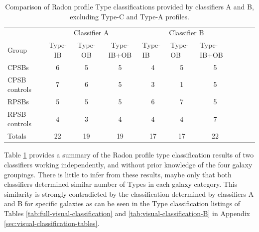 \begin{table}
\caption[Comparison of Radon profile classifications by classifiers A and B, excluding Types A and B]{Comparison of Radon profile Type classifications provided by classifiers A and B, excluding Type-C and Type-A profiles.}
\label{tab:Radon-VC3-results}
\begin{tabular}{lccccccccc}
\hline
 & \multicolumn{3}{c}{Classifier A} & \multicolumn{3}{c}{Classifier B} \\ 
Group & Type-IB & Type-OB & Type-IB+OB & \multicolumn{1}{l}{Type-IB} & \multicolumn{1}{l}{Type-OB} & \multicolumn{1}{l}{Type-IB+OB} \\
\hline
CPSBs & 6 & 5 & 5 & 4 & 5 & 5 \\
CPSB controls & 7 & 6 & 5 & 3 & 1 & 5 \\
RPSBs & 5 & 5 & 5 & 6 & 7 & 5 \\
RPSB controls & 4 & 3 & 4 & 4 & 4 & 7 \\
\hline
Totals & 22 & 19 & 19 & 17 & 17 & 22 \\
\hline
\end{tabular}
\end{table}

Table \ref{tab:Radon-VC3-results} provides a summary of the Radon profile type classification results of two classifiers working independently, and without prior knowledge of the four galaxy groupings. There is little to infer from these results, maybe only that both classifiers determined similar number of Types in each galaxy category. This similarity is strongly contradicted by the classification determined by classifiers A and B for specific galaxies as can be seen in the Type classification listings of Tables \ref{tab:full-visual-classification} and \ref{tab:visual-classification-B} in Appendix \ref{sec:visual-classification-tables}.

